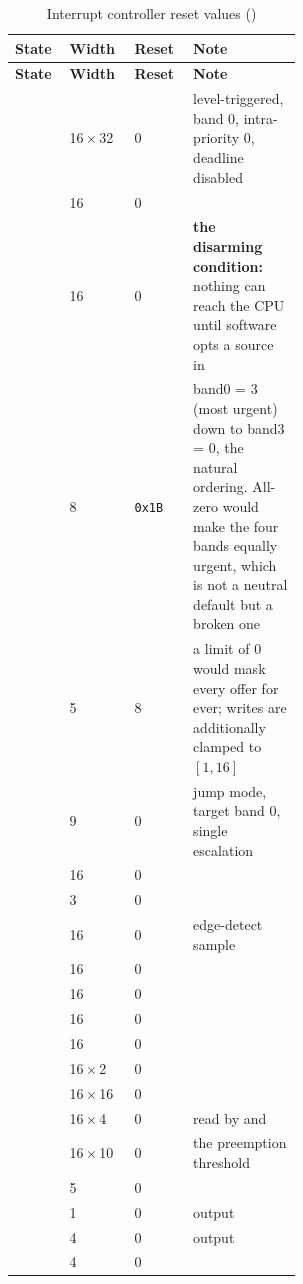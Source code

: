 {\small
\begin{longtable}{@{}L{0.19\linewidth}llL{0.38\linewidth}@{}}
\caption{Interrupt controller reset values ()}
\label{tab:picreset}\\
\toprule
\textbf{State} & \textbf{Width} & \textbf{Reset} & \textbf{Note} \\
\midrule
\endfirsthead
\toprule
\textbf{State} & \textbf{Width} & \textbf{Reset} & \textbf{Note} \\
\midrule
\endhead
\bottomrule
\endfoot
\bottomrule
\endlastfoot
{}  & 16\,$\times$\,32 & 0 & level-triggered, band 0,
  intra-priority 0, deadline disabled \\
       & 16 & 0 & \\
    & 16 & 0 & \textbf{the disarming condition:} nothing can
  reach the CPU until software opts a source in \\
      & 8  & \texttt{0x1B} & band0 = 3 (most urgent) down to
  band3 = 0, the natural ordering. All-zero would make the four bands equally
  urgent, which is not a neutral default but a broken one \\
      & 5  & 8 & a limit of 0 would mask every offer for ever;
  writes are additionally clamped to $[1,16]$ \\
       & 9  & 0 & jump mode, target band 0, single escalation \\
  & 16 & 0 & \\
    & 3  & 0 & \\
    & 16 & 0 & edge-detect sample \\
     & 16 & 0 & \\
         & 16 & 0 & \\
      & 16 & 0 & \\
       & 16 & 0 & \\
    & 16\,$\times$\,2  & 0 & \\
     & 16\,$\times$\,16 & 0 & \\
    & 16\,$\times$\,4  & 0 & read by 
  and  \\
   & 16\,$\times$\,10 & 0 & the preemption threshold \\
          & 5 & 0 & \\
     & 1 & 0 & output \\
 & 4 & 0 & output \\
 & 4 & 0 & \\
\end{longtable}}

